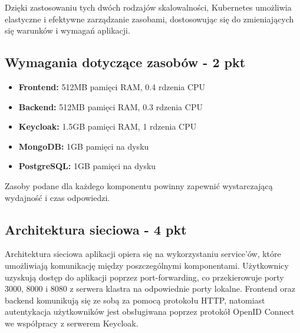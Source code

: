 \documentclass[12pt,a4paper]{article}
\begin{document}
Dzięki zastosowaniu tych dwóch rodzajów skalowalności, Kubernetes umożliwia elastyczne i efektywne zarządzanie zasobami, dostosowując się do zmieniających się warunków i wymagań aplikacji.



\subsection{Wymagania dotyczące zasobów - 2 pkt}
\label{sec:ExampleTables}

\begin{itemize}
    \item \textbf{Frontend:} 512MB pamięci RAM, 0.4 rdzenia CPU
    \item \textbf{Backend:} 512MB pamięci RAM, 0.3 rdzenia CPU
    \item \textbf{Keycloak:} 1.5GB pamięci RAM, 1 rdzenia CPU
    \item \textbf{MongoDB:} 1GB pamięci na dysku
    \item \textbf{PostgreSQL:} 1GB pamięci na dysku
\end{itemize}

Zasoby podane dla każdego komponentu powinny zapewnić wystarczającą wydajność i czas odpowiedzi.


\subsection{Architektura sieciowa - 4 pkt}
\label{sec:ExampleResults}

Architektura sieciowa aplikacji opiera się na wykorzystaniu service'ów, które umożliwiają komunikację między poszczególnymi komponentami. Użytkownicy uzyskują dostęp do aplikacji poprzez port-forwarding, co przekierowuje porty 3000, 8000 i 8080 z serwera klastra na odpowiednie porty lokalne. Frontend oraz backend komunikują się ze sobą za pomocą protokołu HTTP, natomiast autentykacja użytkowników jest obsługiwana poprzez protokół OpenID Connect we współpracy z serwerem Keycloak.

\noindent




\nocite{*}
\end{document}
